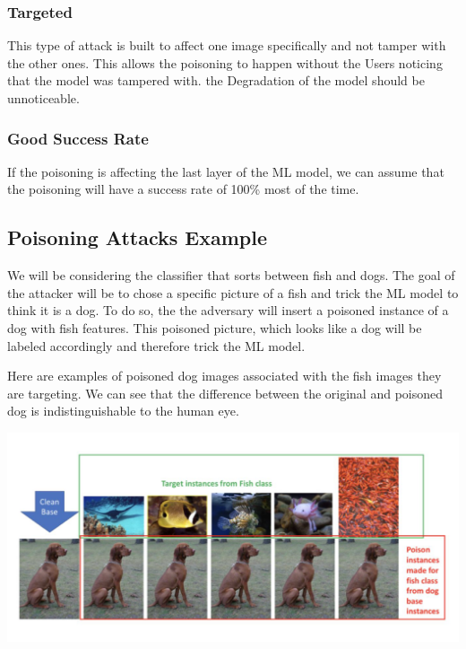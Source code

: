 \documentclass[twoside]{article}
\begin{document}
\subsubsection*{Targeted}

This type of attack is built to affect one image specifically and not tamper with the other ones. This allows the poisoning to happen without the Users noticing that the model was tampered with. the Degradation of the model should be unnoticeable.

\subsubsection*{Good Success Rate}

If the poisoning is affecting the last layer of the ML model, we can assume that the poisoning will have a success rate of 100\% most of the time. 


\subsection{Poisoning Attacks Example}

We will be considering the classifier that sorts between fish and dogs. The goal of the attacker will be to chose a specific picture of a fish and trick the ML model to think it is a dog. To do so, the the adversary will insert a poisoned instance of a dog with fish features. This poisoned picture, which looks like a dog will be labeled accordingly and therefore trick the ML model.


Here are examples of poisoned dog images associated with the fish images they are targeting. We can see that the difference between the original and poisoned dog is indistinguishable to the human eye.   

\begin{center}
    \includegraphics[scale=0.4]{ExamplePoisoning2.png}
\end{center}
\end{document}
